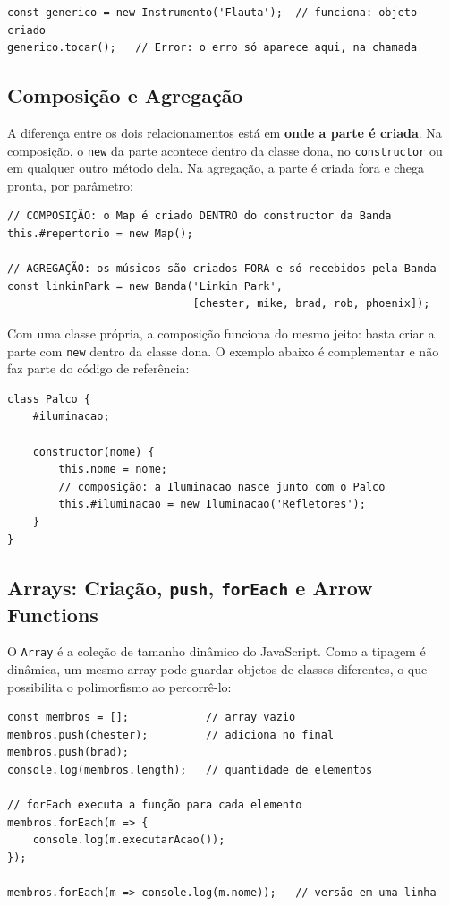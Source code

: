 \begin{lstlisting}[style=javascript]
const generico = new Instrumento('Flauta');  // funciona: objeto criado
generico.tocar();   // Error: o erro só aparece aqui, na chamada
\end{lstlisting}

\subsection{Composição e Agregação}

A diferença entre os dois relacionamentos está em \textbf{onde a parte é criada}. Na composição,
o \texttt{new} da parte acontece dentro da classe dona, no \texttt{constructor} ou em qualquer
outro método dela. Na agregação, a parte é criada fora e chega pronta, por parâmetro:

\begin{lstlisting}[style=javascript]
// COMPOSIÇÃO: o Map é criado DENTRO do constructor da Banda
this.#repertorio = new Map();

// AGREGAÇÃO: os músicos são criados FORA e só recebidos pela Banda
const linkinPark = new Banda('Linkin Park',
                             [chester, mike, brad, rob, phoenix]);
\end{lstlisting}

Com uma classe própria, a composição funciona do mesmo jeito: basta criar a parte com
\texttt{new} dentro da classe dona. O exemplo abaixo é complementar e não faz parte do código de
referência:

\begin{lstlisting}[style=javascript]
class Palco {
    #iluminacao;

    constructor(nome) {
        this.nome = nome;
        // composição: a Iluminacao nasce junto com o Palco
        this.#iluminacao = new Iluminacao('Refletores');
    }
}
\end{lstlisting}

\subsection{Arrays: Criação, \texttt{push}, \texttt{forEach} e Arrow Functions}

O \texttt{Array} é a coleção de tamanho dinâmico do JavaScript. Como a tipagem é dinâmica, um
mesmo array pode guardar objetos de classes diferentes, o que possibilita o polimorfismo ao
percorrê-lo:

\begin{lstlisting}[style=javascript]
const membros = [];            // array vazio
membros.push(chester);         // adiciona no final
membros.push(brad);
console.log(membros.length);   // quantidade de elementos

// forEach executa a função para cada elemento
membros.forEach(m => {
    console.log(m.executarAcao());
});

membros.forEach(m => console.log(m.nome));   // versão em uma linha
\end{lstlisting}

